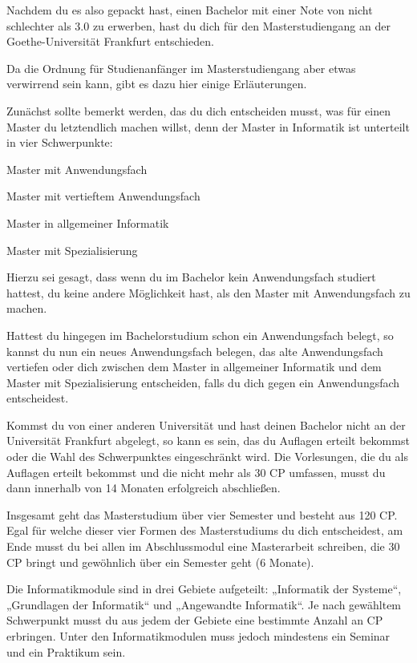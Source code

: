 Nachdem du es also gepackt hast, einen Bachelor mit einer Note von nicht schlechter als 3.0 zu erwerben, hast du dich für den Masterstudiengang an der Goethe-Universität Frankfurt entschieden.


Da die Ordnung für Studienanfänger im Masterstudiengang aber etwas verwirrend sein kann, gibt es dazu hier einige Erläuterungen.


Zunächst sollte bemerkt werden, das du dich entscheiden musst, was für einen Master du letztendlich machen willst, denn der Master in Informatik ist unterteilt in vier Schwerpunkte:
\begin{noindEnumerate}
\item Master mit Anwendungsfach
\item Master mit vertieftem Anwendungsfach
\item Master in allgemeiner Informatik
\item Master mit Spezialisierung
\end{noindEnumerate}

Hierzu sei gesagt, dass wenn du im Bachelor kein Anwendungsfach studiert hattest, du keine andere Möglichkeit hast, als den Master mit Anwendungsfach zu machen.


Hattest du hingegen im Bachelorstudium schon ein Anwendungsfach belegt, so kannst du nun ein neues Anwendungsfach belegen, das alte Anwendungsfach vertiefen oder dich zwischen dem Master in allgemeiner Informatik und dem Master mit Spezialisierung entscheiden, falls du dich gegen ein Anwendungsfach entscheidest.


Kommst du von einer anderen Universität und hast deinen Bachelor nicht an der Universität Frankfurt abgelegt, so kann es sein, das du Auflagen erteilt bekommst oder die Wahl des Schwerpunktes eingeschränkt wird. Die Vorlesungen, die du als Auflagen erteilt bekommst und die nicht mehr als 30 CP umfassen, musst du dann innerhalb von 14 Monaten erfolgreich abschließen.


Insgesamt geht das Masterstudium über vier Semester und besteht aus 120 CP. Egal für welche dieser vier Formen des Masterstudiums du dich entscheidest, am Ende musst du bei allen im Abschlussmodul eine Masterarbeit schreiben, die 30 CP bringt und gewöhnlich über ein Semester geht (6 Monate).


Die Informatikmodule sind in drei Gebiete aufgeteilt: „Informatik der Systeme“, „Grundlagen der Informatik“ und „Angewandte Informatik“. Je nach gewähltem Schwerpunkt musst du aus jedem der Gebiete eine bestimmte Anzahl an CP erbringen. Unter den Informatikmodulen muss jedoch mindestens ein Seminar und ein Praktikum sein.


